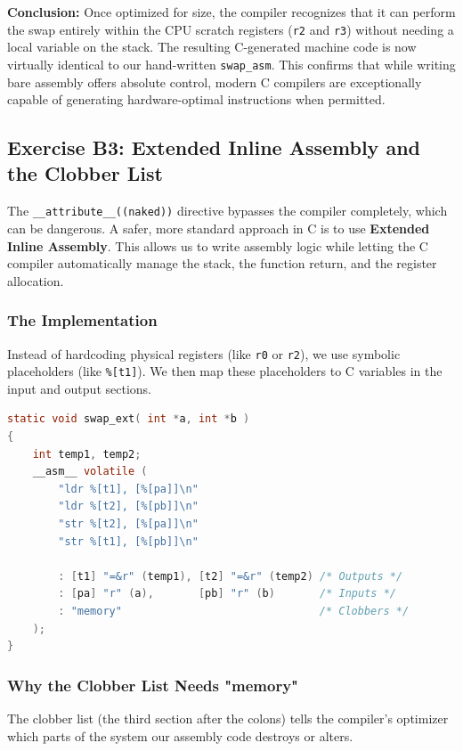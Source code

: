 \textbf{Conclusion:} Once optimized for size, the compiler recognizes that it can perform the swap entirely within the CPU scratch registers (\texttt{r2} and \texttt{r3}) without needing a local variable on the stack. The resulting C-generated machine code is now virtually identical to our hand-written \texttt{swap\_asm}. This confirms that while writing bare assembly offers absolute control, modern C compilers are exceptionally capable of generating hardware-optimal instructions when permitted.


\subsection{Exercise B3: Extended Inline Assembly and the Clobber List}
The \texttt{\_\_attribute\_\_((naked))} directive bypasses the compiler completely, which can be dangerous. A safer, more standard approach in C is to use \textbf{Extended Inline Assembly}. This allows us to write assembly logic while letting the C compiler automatically manage the stack, the function return, and the register allocation.

\subsubsection{The Implementation}
Instead of hardcoding physical registers (like \texttt{r0} or \texttt{r2}), we use symbolic placeholders (like \texttt{\%[t1]}). We then map these placeholders to C variables in the input and output sections.

\begin{lstlisting}[language=c]
static void swap_ext( int *a, int *b )
{
    int temp1, temp2;
    __asm__ volatile (
        "ldr %[t1], [%[pa]]\n"
        "ldr %[t2], [%[pb]]\n"
        "str %[t2], [%[pa]]\n"
        "str %[t1], [%[pb]]\n"
        
        : [t1] "=&r" (temp1), [t2] "=&r" (temp2) /* Outputs */
        : [pa] "r" (a),       [pb] "r" (b)       /* Inputs */
        : "memory"                               /* Clobbers */
    );
}
\end{lstlisting}

\subsubsection{Why the Clobber List Needs "memory"}
The clobber list (the third section after the colons) tells the compiler's optimizer which parts of the system our assembly code destroys or alters. 

